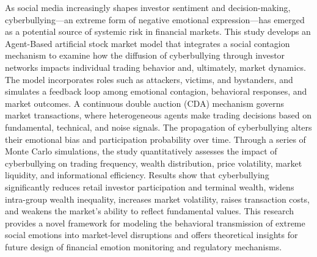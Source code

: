 \documentclass[
    type = bachelor, %
    decl-page,  %
    oneside,                %
  ]{njuthesis}
\begin{document}
\begin{abstract*}
As social media increasingly shapes investor sentiment and decision-making, cyberbullying—an extreme form of negative emotional expression—has emerged as a potential source of systemic risk in financial markets. This study develops an Agent-Based artificial stock market model that integrates a social contagion mechanism to examine how the diffusion of cyberbullying through investor networks impacts individual trading behavior and, ultimately, market dynamics.
The model incorporates roles such as attackers, victims, and bystanders, and simulates a feedback loop among emotional contagion, behavioral responses, and market outcomes. A continuous double auction (CDA) mechanism governs market transactions, where heterogeneous agents make trading decisions based on fundamental, technical, and noise signals. The propagation of cyberbullying alters their emotional bias and participation probability over time.
Through a series of Monte Carlo simulations, the study quantitatively assesses the impact of cyberbullying on trading frequency, wealth distribution, price volatility, market liquidity, and informational efficiency. Results show that cyberbullying significantly reduces retail investor participation and terminal wealth, widens intra-group wealth inequality, increases market volatility, raises transaction costs, and weakens the market's ability to reflect fundamental values.
This research provides a novel framework for modeling the behavioral transmission of extreme social emotions into market-level disruptions and offers theoretical insights for future design of financial emotion monitoring and regulatory mechanisms.

\end{abstract*}

\tableofcontents
\listoffigures
\listoftables

\mainmatter

\end{document}
